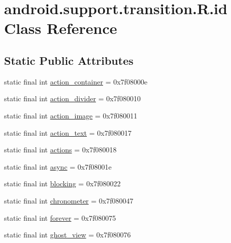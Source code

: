 \hypertarget{classandroid_1_1support_1_1transition_1_1_r_1_1id}{}\section{android.\+support.\+transition.\+R.\+id Class Reference}
\label{classandroid_1_1support_1_1transition_1_1_r_1_1id}
\subsection*{Static Public Attributes}
\begin{DoxyCompactItemize}
\item 
static final int \mbox{\hyperlink{classandroid_1_1support_1_1transition_1_1_r_1_1id_a5dee43fd7c62be47631539c1e8a4a24b}{action\+\_\+container}} = 0x7f08000e
\item 
static final int \mbox{\hyperlink{classandroid_1_1support_1_1transition_1_1_r_1_1id_afb68a5afbb8074cdc5c28afd9a807b62}{action\+\_\+divider}} = 0x7f080010
\item 
static final int \mbox{\hyperlink{classandroid_1_1support_1_1transition_1_1_r_1_1id_a5918eee8de93159a0a8b71c60b620c49}{action\+\_\+image}} = 0x7f080011
\item 
static final int \mbox{\hyperlink{classandroid_1_1support_1_1transition_1_1_r_1_1id_aa2be10087bc2139fb9c96446b83d821a}{action\+\_\+text}} = 0x7f080017
\item 
static final int \mbox{\hyperlink{classandroid_1_1support_1_1transition_1_1_r_1_1id_a551e16c7148efd1e8127d55b1629ace4}{actions}} = 0x7f080018
\item 
static final int \mbox{\hyperlink{classandroid_1_1support_1_1transition_1_1_r_1_1id_a8842bedcbb3950afaa62105e4940ef19}{async}} = 0x7f08001e
\item 
static final int \mbox{\hyperlink{classandroid_1_1support_1_1transition_1_1_r_1_1id_a56e206db702c5ae19ab7c4b70e533b6b}{blocking}} = 0x7f080022
\item 
static final int \mbox{\hyperlink{classandroid_1_1support_1_1transition_1_1_r_1_1id_a3e7496bac42210b89cd538b2f156066d}{chronometer}} = 0x7f080047
\item 
static final int \mbox{\hyperlink{classandroid_1_1support_1_1transition_1_1_r_1_1id_a38354973a8adcee1a8a56240acf674bb}{forever}} = 0x7f080075
\item 
static final int \mbox{\hyperlink{classandroid_1_1support_1_1transition_1_1_r_1_1id_a333cce399e723d86e6164069e17484aa}{ghost\+\_\+view}} = 0x7f080076

\end{DoxyCompactItemize}

